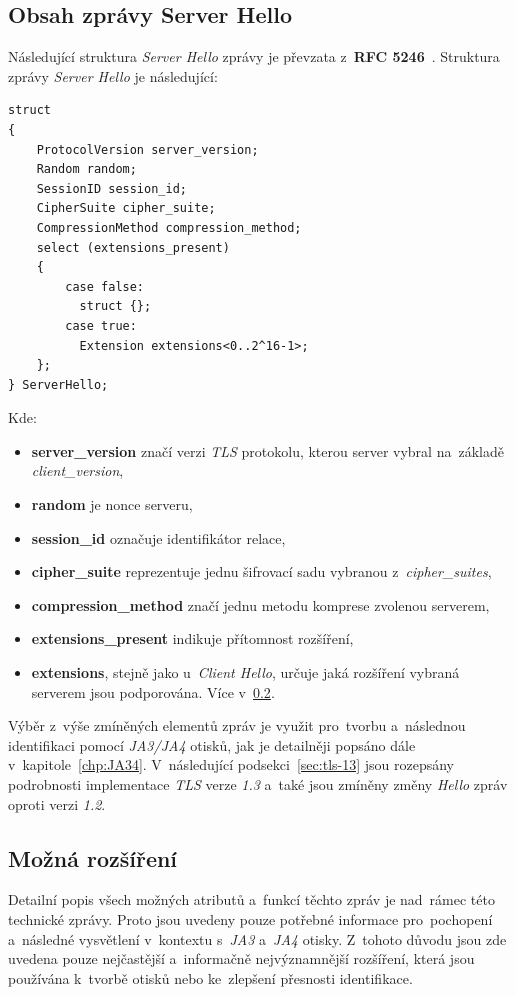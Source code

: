 \subsection{Obsah zprávy Server Hello}
\label{sec:serverhello}
Následující struktura \textit{Server Hello} zprávy je převzata z~\textbf{RFC 5246}~\cite{rfc-tls12}. Struktura zprávy \textit{Server Hello} je následující:

\begin{verbatim}
struct 
{
    ProtocolVersion server_version;
    Random random;
    SessionID session_id;
    CipherSuite cipher_suite;
    CompressionMethod compression_method;
    select (extensions_present) 
    {
        case false:
          struct {};
        case true:
          Extension extensions<0..2^16-1>;
    };
} ServerHello;
\end{verbatim}
Kde:
\begin{itemize}
	\item \textbf{server\_version} značí verzi \textit{TLS} protokolu, kterou server vybral na~základě \textit{client\_version},
	\item \textbf{random} je nonce serveru,
	\item \textbf{session\_id} označuje identifikátor relace,
	\item \textbf{cipher\_suite} reprezentuje jednu šifrovací sadu vybranou z~\textit{cipher\_suites},
	\item \textbf{compression\_method} značí jednu metodu komprese zvolenou serverem,    
	\item \textbf{extensions\_present} indikuje přítomnost rozšíření,
	\item \textbf{extensions}, stejně jako u~\textit{Client Hello}, určuje jaká rozšíření vybraná serverem jsou podporována. Více v~\ref{subsec:ext}.
\end{itemize}

Výběr z~výše zmíněných elementů zpráv je využit pro~tvorbu a~následnou identifikaci pomocí \textit{JA3/JA4} otisků, jak je detailněji popsáno dále v~kapitole~\ref{chp:JA34}. V~následující podsekci~\ref{sec:tls-13} jsou rozepsány podrobnosti implementace \textit{TLS} verze \textit{1.3} a~také jsou zmíněny změny \textit{Hello} zpráv oproti verzi \textit{1.2}. 

\subsection{Možná rozšíření}
\label{subsec:ext}
Detailní popis všech možných atributů a~funkcí těchto zpráv je nad~rámec této technické zprávy. Proto jsou uvedeny pouze potřebné informace pro~pochopení a~následné vysvětlení v~kontextu s~\textit{JA3} a~\textit{JA4} otisky. Z~tohoto důvodu jsou zde uvedena pouze nejčastější a~informačně nejvýznamnější rozšíření, která jsou používána k~tvorbě otisků nebo ke~zlepšení přesnosti identifikace.

